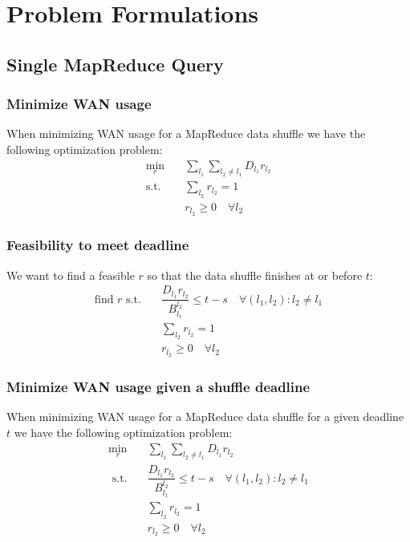 \section{Problem Formulations}
\label{sec:problem}

\subsection{Single MapReduce Query}

\subsubsection*{Minimize WAN usage}

When minimizing WAN usage for a MapReduce data shuffle we have the following optimization problem:
\begin{subequations}
	\begin{align}
		\min_{r} \quad & \sum_{l_1}\sum_{l_2\neq l_1}D_{l_1}r_{l_2} \\
		\text{s.t.} \quad & \sum_{l_2}r_{l_2} = 1 \\
		& r_{l_2} \geq 0 \quad \forall l_2
	\end{align}
\end{subequations}

\subsubsection*{Feasibility to meet deadline}

We want to find a feasible $r$ so that the data shuffle finishes at or before $t$:
\begin{subequations}
	\begin{align}
		\text{find } r \text{ s.t.} \quad & \dfrac{D_{l_1}r_{l_2}}{B_{l_1}^{l_2}} \leq t - s \quad \forall (l_1,l_2):l_2\neq l_1 \\
		& \sum_{l_2}r_{l_2} = 1 \\
		& r_{l_2} \geq 0 \quad \forall l_2
	\end{align}
\end{subequations}

\subsubsection*{Minimize WAN usage given a shuffle deadline}
When minimizing WAN usage for a MapReduce data shuffle for a given deadline $t$ we have the following optimization problem:
\begin{subequations}
	\begin{align}
		\min_{r} \quad & \sum_{l_1}\sum_{l_2\neq l_1}D_{l_1}r_{l_2} \\
		\text{ s.t.} \quad & \dfrac{D_{l_1}r_{l_2}}{B_{l_1}^{l_2}} \leq t - s \quad \forall (l_1,l_2):l_2\neq l_1 \\
		& \sum_{l_2}r_{l_2} = 1 \\
		& r_{l_2} \geq 0 \quad \forall l_2
	\end{align}
\end{subequations}
